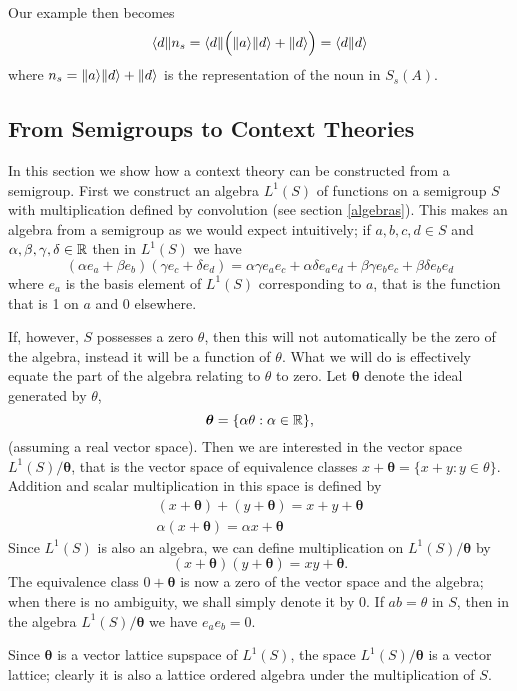 Our example then becomes
$$\langle d\|n_s = \langle d\| \Big(\|a \rangle\|d \rangle + \|d \rangle\Big) = \langle d\| d\rangle$$
where $n_s = \|a \rangle\|d \rangle + \|d \rangle$ is the representation of the noun in $S_s(A)$.

\subsection{From Semigroups to Context Theories}
\label{semigroup-context}

In this section we show how a context theory can be constructed from a semigroup. First we construct an algebra $L^1(S)$ of functions on a semigroup $S$ with multiplication defined by convolution (see section \ref{algebras}). This makes an algebra from a semigroup as we would expect intuitively; if $a,b,c,d\in S$ and $\alpha,\beta,\gamma,\delta \in \mathbb{R}$ then in $L^1(S)$ we have
$$(\alpha e_a + \beta e_b)(\gamma e_c + \delta e_d) = \alpha\gamma e_ae_c + \alpha\delta e_ae_d + \beta\gamma e_be_c + \beta\delta e_be_d$$
where $e_a$ is the basis element of $L^1(S)$ corresponding to $a$, that is the function that is 1 on $a$ and 0 elsewhere.

If, however, $S$ possesses a zero $\theta$, then this will not automatically be the zero of the algebra, instead it will be a function of $\theta$. What we will do is effectively equate the part of the algebra relating to $\theta$ to zero. Let $\bm{\theta}$ denote the ideal generated by $\theta$,
$$\bm{\theta} = \{\alpha\theta : \alpha \in \mathbb{R}\},$$
(assuming a real vector space). Then we are interested in the vector space $L^1(S)/\bm{\theta}$, that is the vector space of equivalence classes $x + \bm{\theta} = \{x + y: y \in \theta\}$. Addition and scalar multiplication in this space is defined by
\begin{gather*}
(x + \bm{\theta}) + (y + \bm{\theta}) = x + y + \bm{\theta}\\
\alpha(x + \bm{\theta}) = \alpha x + \bm{\theta}
\end{gather*}
Since $L^1(S)$ is also an algebra, we can define multiplication on $L^1(S)/\bm{\theta}$ by
$$(x + \bm{\theta})(y + \bm{\theta}) = xy + \bm{\theta}.$$
The equivalence class $0 + \bm{\theta}$ is now a zero of the vector space and the algebra; when there is no ambiguity, we shall simply denote it by $0$. If $ab = \theta$ in $S$, then in the algebra $L^1(S)/\bm{\theta}$ we have $e_ae_b = 0$.

Since $\bm{\theta}$ is a vector lattice supspace of $L^1(S)$, the space $L^1(S)/\bm{\theta}$ is a vector lattice; clearly it is also a lattice ordered algebra under the multiplication of $S$.

